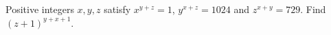 Positive integers $x,y,z$ satisfy $x^{y+z}=1$, $y^{x+z}=1024$ and $z^{x+y}=729$. Find $(z+1)^{y+x+1}$.
